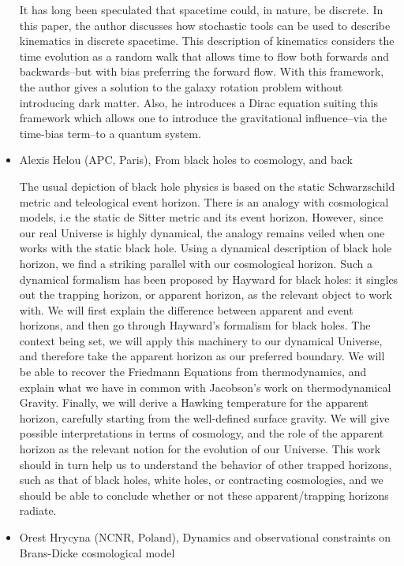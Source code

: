 \documentclass[letterpaper,12pt]{article}
\newcommand{\talk}[2]{{\fontspec{Lato Bold} #1,} {\fontspec{Lato Light Italic} #2}}
\begin{document}
\begin{itemize}
It has long been speculated that spacetime could, in nature, be discrete. In this paper, the author discusses how stochastic tools can be used to describe kinematics in discrete spacetime. This description of kinematics considers the time evolution as a random walk that allows time to flow both forwards and backwards--but with bias preferring the forward flow. With this framework, the author gives a solution to the galaxy rotation problem without introducing dark matter. Also, he introduces a Dirac equation suiting this framework which allows one to introduce the gravitational influence--via the time-bias term--to a quantum system.

\item \talk{Alexis Helou (APC, Paris)}{From black holes to cosmology, and back}

The usual depiction of black hole physics is based on the static Schwarzschild metric and teleological event horizon. There is an analogy with cosmological models, i.e the static de Sitter metric and its event horizon. However, since our real Universe is highly dynamical, the analogy remains veiled when one works with the static black hole. Using a dynamical description of black hole horizon, we find a striking parallel with our cosmological horizon. Such a dynamical formalism has been proposed by Hayward for black holes: it singles out the trapping horizon, or apparent horizon, as the relevant object to work with. We will first explain the difference between apparent and event horizons, and then go through Hayward’s formalism for black holes. The context being set, we will apply this machinery to our dynamical Universe, and therefore take the apparent horizon as our preferred boundary. We will be able to recover the Friedmann Equations from thermodynamics, and explain what we have in common with Jacobson’s work on thermodynamical Gravity. Finally, we will derive a Hawking temperature for the apparent horizon, carefully starting from the well-defined surface gravity. We will give possible interpretations in terms of cosmology, and the role of the apparent horizon as the relevant notion for the evolution of our Universe. This work should in turn help us to understand the behavior of other trapped horizons, such as that of black holes, white holes, or contracting cosmologies, and we should be able to conclude whether or not these apparent/trapping horizons radiate.

\item \talk{Orest Hrycyna (NCNR, Poland)}{Dynamics and observational constraints on Brans-Dicke cosmological model}


\end{itemize}
\end{document}
